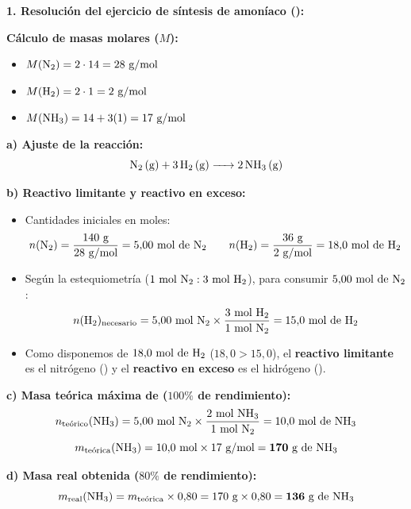﻿\documentclass[11pt,a4paper]{article}
\begin{document}
\pagestyle{empty}

\noindent\textbf{1. Resolución del ejercicio de síntesis de amoníaco ():}

\vspace{0.2cm}
\noindent\textbf{Cálculo de masas molares ($M$):}
\begin{itemize}[leftmargin=1.5em, itemsep=2pt]
    \item $M(\ce{N2}) = 2 \cdot 14 = 28\text{ g/mol}$
    \item $M(\ce{H2}) = 2 \cdot 1 = 2\text{ g/mol}$
    \item $M(\ce{NH3}) = 14 + 3(1) = 17\text{ g/mol}$
\end{itemize}

\vspace{0.15cm}
\noindent\textbf{a) Ajuste de la reacción:}
\[
\ce{N2 (g) + 3 H2 (g) -> 2 NH3 (g)}
\]

\vspace{0.1cm}
\noindent\textbf{b) Reactivo limitante y reactivo en exceso:}
\begin{itemize}[leftmargin=1.5em, itemsep=2pt]
    \item Cantidades iniciales en moles:
    \[
    n(\ce{N2}) = \frac{140\text{ g}}{28\text{ g/mol}} = 5{,}00\text{ mol de \ce{N2}} \qquad n(\ce{H2}) = \frac{36\text{ g}}{2\text{ g/mol}} = 18{,}0\text{ mol de \ce{H2}}
    \]
    \item Según la estequiometría ($1\text{ mol \ce{N2}} : 3\text{ mol \ce{H2}}$), para consumir $5{,}00\text{ mol de \ce{N2}}$:
    \[
    n(\ce{H2})_{\text{necesario}} = 5{,}00\text{ mol \ce{N2}} \times \frac{3\text{ mol \ce{H2}}}{1\text{ mol \ce{N2}}} = 15{,}0\text{ mol de \ce{H2}}
    \]
    \item Como disponemos de $18{,}0\text{ mol de \ce{H2}}$ ($18{,}0 > 15{,}0$), el \textbf{reactivo limitante} es el nitrógeno () y el \textbf{reactivo en exceso} es el hidrógeno ().
\end{itemize}

\vspace{0.1cm}
\noindent\textbf{c) Masa teórica máxima de  ($100\%$ de rendimiento):}
\[
n_{\text{teórico}}(\ce{NH3}) = 5{,}00\text{ mol \ce{N2}} \times \frac{2\text{ mol \ce{NH3}}}{1\text{ mol \ce{N2}}} = 10{,}0\text{ mol de \ce{NH3}}
\]
\[
m_{\text{teórica}}(\ce{NH3}) = 10{,}0\text{ mol} \times 17\text{ g/mol} = \mathbf{170\text{ g de \ce{NH3}}}
\]

\vspace{0.1cm}
\noindent\textbf{d) Masa real obtenida ($80\%$ de rendimiento):}
\[
m_{\text{real}}(\ce{NH3}) = m_{\text{teórica}} \times 0{,}80 = 170\text{ g} \times 0{,}80 = \mathbf{136\text{ g de \ce{NH3}}}
\]
\end{document}
